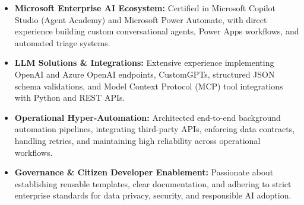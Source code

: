 \documentclass[]{cover}
\begin{document}


\currentdate{\today}



{\raggedright\fontsize{10.5pt}{13pt}\selectfont
\begin{itemize}
    \item \textbf{Microsoft Enterprise AI Ecosystem:} Certified in Microsoft Copilot Studio (Agent Academy) and Microsoft Power Automate, with direct experience building custom conversational agents, Power Apps workflows, and automated triage systems.
    \item \textbf{LLM Solutions \& Integrations:} Extensive experience implementing OpenAI and Azure OpenAI endpoints, CustomGPTs, structured JSON schema validations, and Model Context Protocol (MCP) tool integrations with Python and REST APIs.
    \item \textbf{Operational Hyper-Automation:} Architected end-to-end background automation pipelines, integrating third-party APIs, enforcing data contracts, handling retries, and maintaining high reliability across operational workflows.
    \item \textbf{Governance \& Citizen Developer Enablement:} Passionate about establishing reusable templates, clear documentation, and adhering to strict enterprise standards for data privacy, security, and responsible AI adoption.
\end{itemize}\par}
\vspace{4pt}
\end{document}
